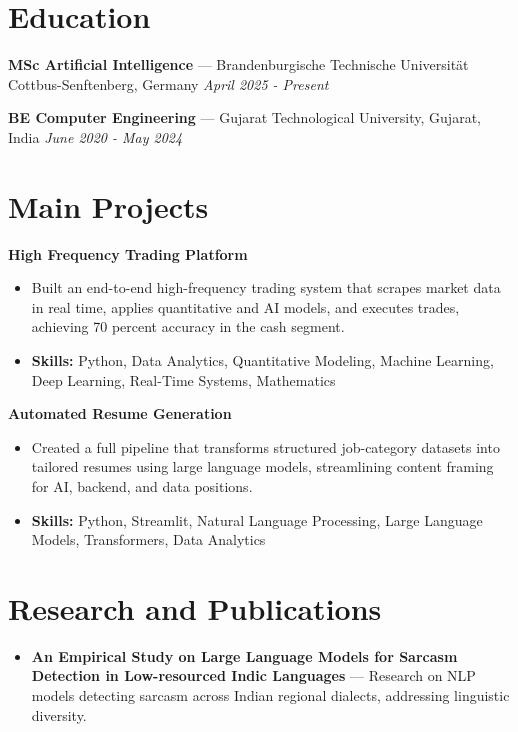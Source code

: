 \documentclass[a4paper,10pt]{article}
\begin{document}
\section*{Education}
\textbf{MSc Artificial Intelligence} — Brandenburgische Technische Universität Cottbus-Senftenberg, Germany \hfill \textit{April 2025 - Present}\par
\vspace{1.5pt}
\textbf{BE Computer Engineering} — Gujarat Technological University, Gujarat, India \hfill \textit{June 2020 - May 2024}\par

\section*{Main Projects}
\textbf{High Frequency Trading Platform}\par
\vspace{1pt}
\begin{itemize}
  \item Built an end-to-end high-frequency trading system that scrapes market data in real time, applies quantitative and AI models, and executes trades, achieving 70 percent accuracy in the cash segment.
  \item \textbf{Skills:} Python, Data Analytics, Quantitative Modeling, Machine Learning, Deep Learning, Real-Time Systems, Mathematics
\end{itemize}
\vspace{3pt}
\textbf{Automated Resume Generation}\par
\vspace{1pt}
\begin{itemize}
  \item Created a full pipeline that transforms structured job-category datasets into tailored resumes using large language models, streamlining content framing for AI, backend, and data positions.
  \item \textbf{Skills:} Python, Streamlit, Natural Language Processing, Large Language Models, Transformers, Data Analytics
\end{itemize}

\section*{Research and Publications}
\begin{itemize}
\item \textbf{An Empirical Study on Large Language Models for Sarcasm Detection in Low-resourced Indic Languages} — Research on NLP models detecting sarcasm across Indian regional dialects, addressing linguistic diversity.
\end{itemize}
\end{document}

